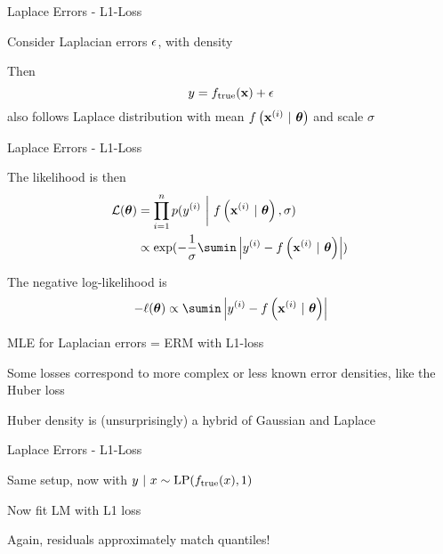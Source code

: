 \documentclass[11pt,compress,t,notes=noshow, xcolor=table]{beamer}
\begin{document}
\begin{framei}[sep=M]{Laplace Errors - L1-Loss}

\item Consider Laplacian errors $\epsilon$, with density 

\vfill


\item Then
$$
y = f_{\text{true}}(\mathbf{x}) + \epsilon 
$$
also follows Laplace distribution with mean $f\left(\mathbf{x}^{(i)} ~|~ \bm{\theta}\right)$ and scale  $\sigma$ 

\end{framei}
\begin{framei}[sep=M]{Laplace Errors - L1-Loss}

    \item The likelihood is then 
\begin{align*}
\LL(\thetav) &= \prod_{i=1}^n \pdf(\yi ~\bigg|~ \fxit, \sigma) \\ &\propto \exp(-\frac{1}{\sigma}\sumin \left|\yi - \fxit\right|)\,
\end{align*}
\item The negative log-likelihood is
$$
- \loglt \propto \sumin \left|\yi - \fxit\right|
$$

\item MLE for Laplacian errors = ERM with L1-loss 

\item Some losses correspond to more complex or less known error densities, like the Huber loss 

\item Huber density is (unsurprisingly) a hybrid of Gaussian and Laplace

\end{framei}
\begin{framei}[sep=M]{Laplace Errors - L1-Loss}

\item Same setup, now with $y ~|~x \sim \text{LP}(f_{\text{true}}(x), 1)$ 
\item Now fit LM with L1 loss

\vfill



\item Again, residuals approximately match quantiles!


\end{framei}
\end{document}
